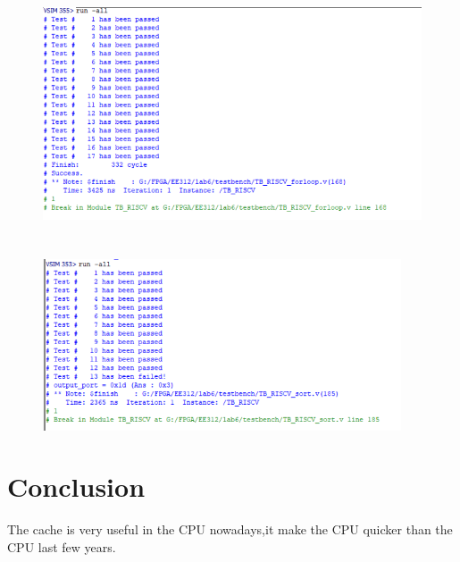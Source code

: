 \documentclass[12pt,a4paper]{article}
\begin{document}
\begin{figure}[H]
  \centering
  \includegraphics[height=3in]{forloop.PNG}
  \end{figure}

  \begin{figure}[H]
    \centering
    \includegraphics[height=2in]{sort.PNG}
    \end{figure}


\section{Conclusion}

The cache is very useful in the CPU nowadays,it make the CPU quicker than the CPU last few years.
\end{document}
